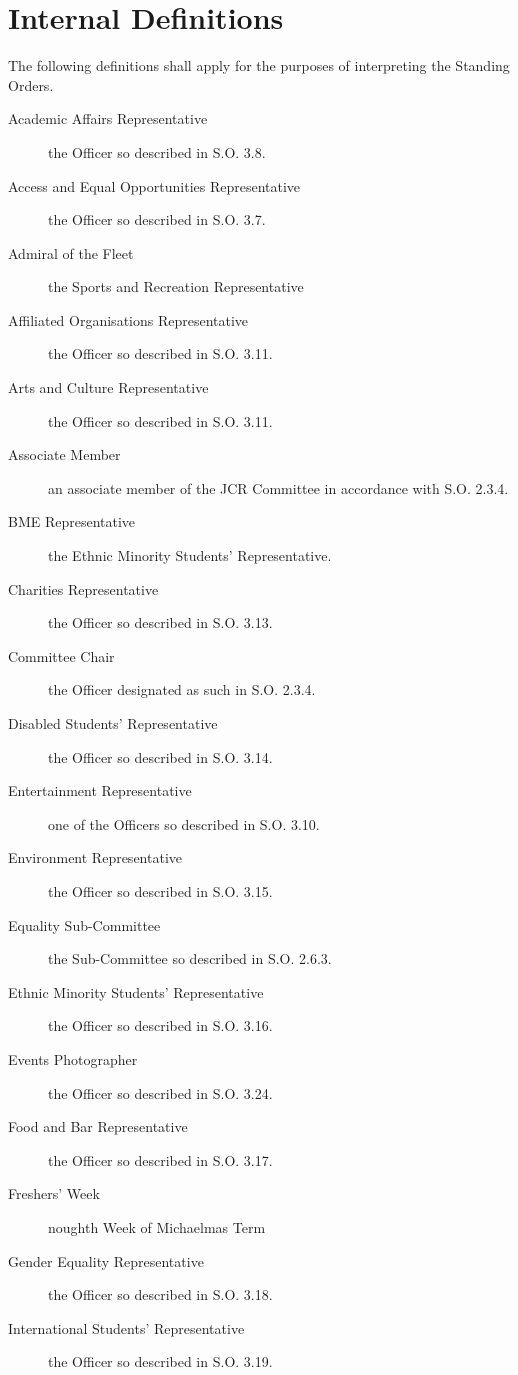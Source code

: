 \chapter{Internal Definitions}

\appnpara The following definitions shall apply for the purposes of interpreting the Standing Orders.
\begin{description}
\item[Academic Affairs Representative] the Officer so described in S.O. 3.8.
\item[Access and Equal Opportunities Representative] the Officer so described in S.O. 3.7.
\item[Admiral of the Fleet] the Sports and Recreation Representative
\item[Affiliated Organisations Representative] the Officer so described in S.O. 3.11.
\item[Arts and Culture Representative] the Officer so described in S.O. 3.11.
\item[Associate Member] an associate member of the JCR Committee in accordance with S.O. 2.3.4.
\item[BME Representative] the Ethnic Minority Students’ Representative.
\item[Charities Representative] the Officer so described in S.O. 3.13.
\item[Committee Chair] the Officer designated as such in S.O. 2.3.4.
\item[Disabled Students’ Representative] the Officer so described in S.O. 3.14.
\item[Entertainment Representative] one of the Officers so described in S.O. 3.10.
\item[Environment Representative] the Officer so described in S.O. 3.15.
\item[Equality Sub-Committee] the Sub-Committee so described in S.O. 2.6.3.
\item[Ethnic Minority Students' Representative] the Officer so described in S.O. 3.16.
\item[Events Photographer] the Officer so described in S.O. 3.24.
\item[Food and Bar Representative] the Officer so described in S.O. 3.17.
\item[Freshers' Week] noughth Week of Michaelmas Term
\item[Gender Equality Representative] the Officer so described in S.O. 3.18.
\item[International Students' Representative] the Officer so described in S.O. 3.19.

\end{description}
